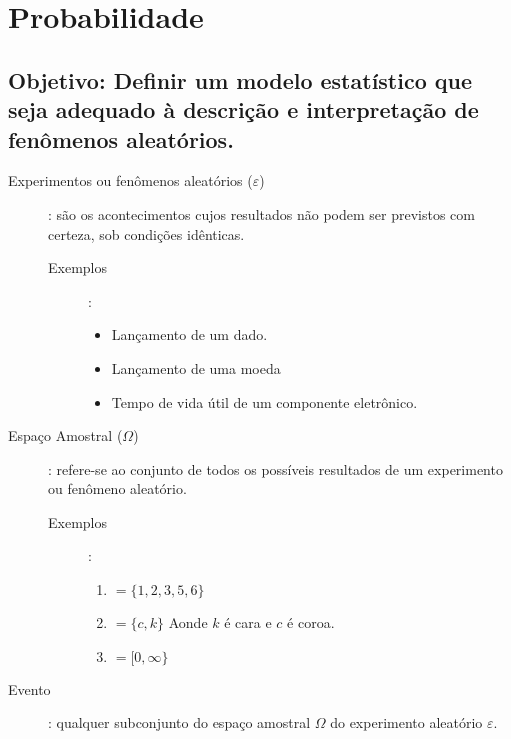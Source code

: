 \documentclass[11pt,a4paper]{book}
\begin{document}
\chapter{Probabilidade}

\section*{Objetivo: Definir um modelo estatístico que seja adequado à descrição e interpretação de fenômenos aleatórios.}
\begin{description}

  \item [Experimentos ou fenômenos aleatórios ($\varepsilon$)]: são os acontecimentos cujos resultados não podem ser previstos 
    com certeza, sob condições idênticas.

    \begin{description}
      \item [Exemplos]:

        \begin{itemize}
          \item Lançamento de um dado.
          \item Lançamento de uma moeda
          \item Tempo de vida útil de um componente eletrônico.
        \end{itemize}
    \end{description}
  \item [Espaço Amostral ($\Omega$)]: refere-se ao conjunto de todos os possíveis resultados de um experimento ou fenômeno 
    aleatório.
    \begin{description}
      \item [Exemplos]:
        \begin{enumerate}[label=$\Omega_{\arabic*}$]
          \item $= \{ 1,2,3,5,6 \}$ 
          \item $= \{ c,k \}$ Aonde $k$ é cara e $c$ é coroa.
        \item $= [ 0,\infty \}$ 
      \end{enumerate}
  \end{description}
\item [Evento]: qualquer subconjunto do espaço amostral $\Omega$ do experimento aleatório $\varepsilon$.

\end{description}
\end{document}
